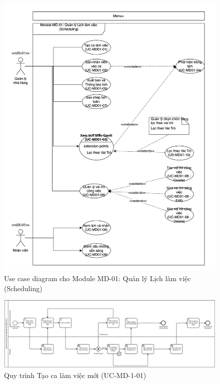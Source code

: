 \begin{figure}[H]
	\centering
	\includegraphics[width=15cm]{Sections/tong_quan/functional_spec/img/ucd01.png}

     \vspace{0.5cm}
    \caption{Use case diagram cho Module MD-01: Quản lý Lịch làm việc (Scheduling)}
\end{figure}


\begin{figure}[H]
	\centering
	\includegraphics[width=15cm]{Sections/tong_quan/functional_spec/img/Screenshot 2025-04-30 at 20.11.53.png}

     \vspace{0.5cm}
    \caption{Quy trình Tạo ca làm việc mới (UC-MD-1-01)}
\end{figure}

